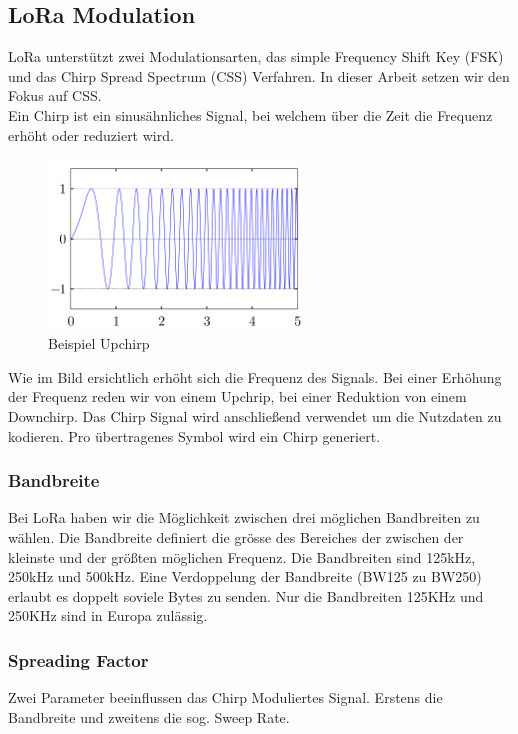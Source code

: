\documentclass[11pt,english,german]{report}
\theoremstyle{definition}
\begin{document}
\subsection{LoRa Modulation}
LoRa unterstützt zwei Modulationsarten, das simple Frequency Shift Key (FSK) und das Chirp Spread Spectrum (CSS) Verfahren. In dieser Arbeit setzen wir den Fokus auf CSS.\\[0.3cm]
Ein Chirp ist ein sinusähnliches Signal, bei welchem über die Zeit die Frequenz erhöht oder reduziert wird.
\begin{figure}[H]
	\centering
	\includegraphics[width=0.6\textwidth]{img/upchirp.png}
	\caption[Beispiel Upchirp]
	{Beispiel Upchirp}
\end{figure}
\noindent
Wie im Bild ersichtlich erhöht sich die Frequenz des Signals. Bei einer Erhöhung der Frequenz reden wir von einem Upchrip, bei einer Reduktion von einem Downchirp. Das Chirp Signal wird anschließend verwendet um die Nutzdaten zu kodieren. Pro übertragenes Symbol wird ein Chirp generiert.

\subsubsection{Bandbreite}
Bei LoRa haben wir die Möglichkeit zwischen drei möglichen Bandbreiten zu wählen. Die Bandbreite definiert die grösse des Bereiches der zwischen der kleinste und der größten möglichen Frequenz. Die Bandbreiten sind 125kHz, 250kHz und 500kHz. Eine Verdoppelung der Bandbreite (BW125 zu BW250) erlaubt es doppelt soviele Bytes zu senden. Nur die Bandbreiten 125KHz und 250KHz sind in Europa zulässig. %

\newpage
\subsubsection{Spreading Factor}
Zwei Parameter beeinflussen das Chirp Moduliertes Signal. Erstens die Bandbreite und zweitens die sog. Sweep Rate.
\end{document}
